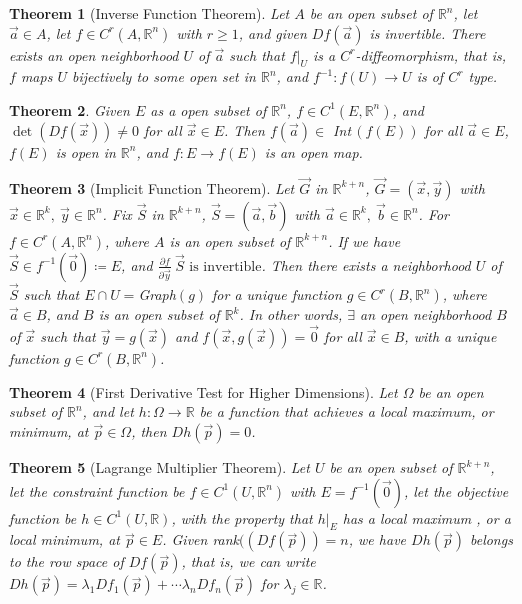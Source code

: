 \documentclass[11pt]{article}
\theoremstyle{break}
\theoremstyle{break}
\newtheorem{thm}{Theorem}[section]
\newcommand{\R}{\mathbb{R}}
\begin{document}
\begin{thm}[\color{red}Inverse Function Theorem\color{black}]
Let $A $ be an open subset of $\R^n$, let $\vec{a}\in A$, let $f\in C^r(A,\R^n)$ with $r\geq 1$, and given $Df(\vec{a})$ is invertible. There exists an open neighborhood $U$ of $\vec{a}$ such that $f|_U$ is a $C^r$-diffeomorphism, that is, $f$ maps $U$ bijectively to some open set in $\R^n$, and $f^{-1}:f(U) \to U$ is of $C^r$ type. 
\end{thm}

\begin{thm}
Given $E$ as a open subset of $\R^n$, $f \in C^1(E,\R^n)$, and $\det(Df(\vec{x})) \neq 0$ for all $\vec{x}\in E$. Then $f(\vec{a}) \in $ Int\,$(f(E))$ for all $\vec{a}\in E$, $f(E)$ is open in $\R^n$, and $f:E \to f(E)$ is an open map.
\end{thm}

\begin{thm}[Implicit Function Theorem]
Let $\vec{G}$ in $\R^{k+n}$, $\vec{G} =(\vec{x}, \vec{y})$ with $\vec{x}\in \R^k,\ \vec{y}\in \R^n$. Fix $\vec{S}$ in $\R^{k+n}$, $\vec{S} = (\vec{a}, \vec{b})$ with $\vec{a}\in \R^k,\ \vec{b}\in \R^n$.
For $f \in C^r(A,\R^n)$, where $A$ is an open subset of $\R^{k+n}$. If we have $\vec{S} \in f^{-1}(\vec{0}) \coloneqq E$, and $\frac{\partial f}{\partial \vec{y}}\ \vec{S} \text{ is invertible}$. Then there exists a neighborhood $U$ of $\vec{S}$ such that $E \cap U = $Graph$(g)$ for a unique function $g \in C^r(B,\R^n)$, where $\vec{a}\in B$, and $B$ is an open subset of $\R^k$. In other words, $\exists$ an open neighborhood $B$ of $\vec{x}$ such that $\vec{y} = g(\vec{x})$ and $f(\vec{x},g(\vec{x})) = \vec{0}$ for all $\vec{x}\in B$, with a unique function $g \in C^r(B,\R^n)$.
\end{thm}

\begin{thm}[First Derivative Test for Higher Dimensions]
Let $\Omega$ be an open subset of $\R^n$, and let $h: \Omega \to \R$ be a function that achieves a local maximum, or minimum, at $\vec{p}\in \Omega$, then $Dh(\vec{p}) = 0$.
\end{thm}

\begin{thm}[Lagrange Multiplier Theorem]
Let $U$ be an open subset of $\R^{k+n}$, let the constraint function be $f\in C^1(U,\R^n)$ with $E=f^{-1}(\vec{0})$, let the objective function be $h\in C^1(U,\R)$, with the property that $h|_E$ has a local maximum , or a local minimum, at $\vec{p}\in E$. Given rank$((Df(\vec{p})) = n$, we have $Dh(\vec{p})$ belongs to the row space of $Df(\vec{p})$, that is, we can write $Dh(\vec{p}) = \lambda_1 Df_1(\vec{p}) + \cdots \lambda_n Df_n(\vec{p})$ for $\lambda_j \in \R$.
\end{thm}
\end{document}
